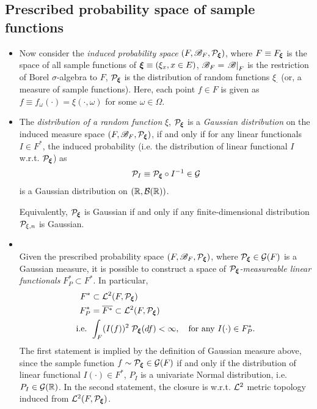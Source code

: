 \documentclass[11pt]{article}
\begin{document}
\subsection{Prescribed probability space of sample functions}
\begin{itemize}
\item Now consider the \emph{induced probability space} $(F, {\mathscr B}_{F}, {\mathcal P}_{\boldsymbol{\xi}})$, where $F\equiv F_{\boldsymbol{\xi}}$ is the space  of all sample functions of $\boldsymbol{\xi}\equiv (\xi_{x}, x\in E)$,  ${\mathscr B}_{F} = \left.{{\mathscr B}}\right\vert_{F}$ is the restriction of Borel $\sigma$-algebra to $F$, ${\mathcal P}_{\boldsymbol{\xi}}$ is the distribution of random functions $\xi_{\cdot}$ (or, a measure of sample functions). Here, each point $f\in F$ is given as $f \equiv f_{\omega}(\cdot) = \xi(\cdot, \omega)$ for some $\omega \in \Omega$.\\

\item \begin{definition}
The \emph{distribution of a random function} $\xi$, ${\mathcal P}_{\boldsymbol{\xi}}$ is a \emph{Gaussian distribution} on the induced measure space $(F, {\mathscr B}_{F}, {\mathcal P}_{\boldsymbol{\xi}})$, if and only if for any linear functionals $I\in F^{*}$, the induced probability (i.e. the distribution of linear functional $I$ w.r.t. ${\mathcal P}_{\boldsymbol{\xi}}$) as 
\begin{align*}
{\mathcal P}_{I}\equiv {\mathcal P}_{\boldsymbol{\xi}}\circ I^{-1} \in {\mathcal G}
\end{align*} is a Gaussian distribution on $({\mathbb R}, {\mathcal B}({\mathbb R}))$.

Equivalently, ${\mathcal P}_{\boldsymbol{\xi}}$ is Gaussian if and only if any finite-dimensional distribution  ${\mathcal P}_{\xi, n}$ is Gaussian.\\
\end{definition}

\item \begin{definition}  \citep{lifshits2013gaussian} \\
Given the prescribed probability space $(F, {\mathscr B}_{F}, {\mathcal P}_{\boldsymbol{\xi}})$, where ${\mathcal P}_{\boldsymbol{\xi}} \in {\mathcal G}(F)$ is a Gaussian measure, it is possible to construct a space of \emph{${\mathcal P}_{\boldsymbol{\xi}}$-measureable linear functionals} $F_{P}^{*} \subset F^{*}$. In particular, 
\begin{align*}
 F^{*}&\subset {\mathcal L}^{2}(F, {\mathcal P}_{\boldsymbol{\xi}})\\
F_{P}^{*}&= \overline{F^{*}} \subset   {\mathcal L}^{2}(F, {\mathcal P}_{\boldsymbol{\xi}})\\
\text{i.e. } & \int_{F} (I(f))^{2} \;{\mathcal P}_{\boldsymbol{\xi}}(df) <\infty, \quad \text{for any }I(\cdot) \in F_{P}^{*}.
\end{align*} The first statement is implied by the definition of Gaussian measure above, since the sample function $f\sim {\mathcal P}_{\boldsymbol{\xi}} \in {\mathcal G}(F)$ if and only if the distribution of linear functional $I(\cdot) \in F^{*}$, $P_{I}$ is a univariate Normal distribution, i.e. $P_{I}\in {\mathcal G}({\mathbb R})$. In the second statement, the closure is w.r.t. ${\mathcal L}^{2}$ metric topology induced from ${\mathcal L}^{2}(F, {\mathcal P}_{\boldsymbol{\xi}})$.\\
\end{definition}



\end{itemize}
\end{document}
